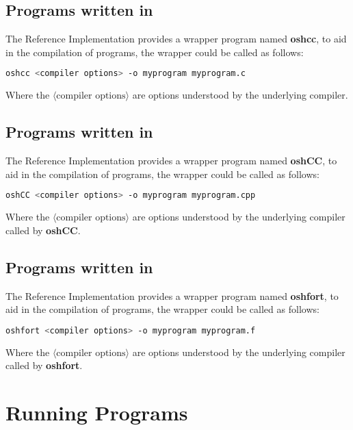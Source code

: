 \subsection*{Programs written in \Clang}

The \openshmem{} Reference Implementation provides a wrapper program named
\textbf{oshcc}, to aid in the compilation of \Clang{} programs, the wrapper
could be called as follows:

\begin{lstlisting}[language=bash]
oshcc <compiler options> -o myprogram myprogram.c
\end{lstlisting}
Where the $\langle\mbox{compiler options}\rangle$ are options understood by the
underlying \Clang{} compiler.


\subsection*{Programs written in \Cpp}

The  \openshmem{} Reference Implementation provides a wrapper program named
\textbf{oshCC}, to aid in the compilation of \Cpp{} programs, the wrapper could
be called as follows:

\begin{lstlisting}[language=bash]
oshCC <compiler options> -o myprogram myprogram.cpp
\end{lstlisting}
Where the $\langle\mbox{compiler options}\rangle$ are options understood by the
underlying \Cpp{} compiler called by \textbf{oshCC}.


\subsection*{Programs written in \Fortran}

The  \openshmem{} Reference Implementation provides a wrapper program named
\textbf{oshfort}, to aid in the compilation of \Fortran{} programs, the wrapper
could be called as follows:

\begin{lstlisting}[language=bash]
oshfort <compiler options> -o myprogram myprogram.f
\end{lstlisting}
Where the $\langle\mbox{compiler options}\rangle$ are options understood by the
underlying \Fortran{} compiler called by \textbf{oshfort}.

\section{Running Programs}

